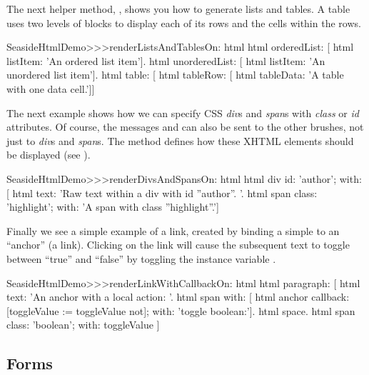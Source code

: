 \documentclass[a4paper,10pt,twoside]{book}
\begin{document}
The next helper method, , shows you how to
generate lists and tables.
A table uses two levels of blocks to display each of its rows and the cells within the
rows.

\begin{code}{}
SeasideHtmlDemo>>>renderListsAndTablesOn: html 
	html orderedList: [
		html listItem: 'An ordered list item'].
	html unorderedList: [
		html listItem: 'An unordered list item'].
	html table: [
		html tableRow: [
			html tableData: 'A table with one data cell.']]
\end{code}

The next example shows how we can specify CSS \emph{div}s and \emph{span}s with
\emph{class} or \emph{id} attributes.
Of course, the messages  and  can also be sent to the other brushes,
not just to \emph{div}s and \emph{span}s.
The method  defines how these XHTML elements should be
displayed (see ).

\begin{code}{}
SeasideHtmlDemo>>>renderDivsAndSpansOn: html 
	html div
		id: 'author';
		with: [
			html text: 'Raw text within a div with id ''author''. '.
			html span
				class: 'highlight';
				with: 'A span with class ''highlight''.']
\end{code}

Finally we see a simple example of a link, created by binding a simple
 to an ``anchor'' (\ie a link).
Clicking on the link will cause the subsequent text to toggle between ``true'' and
``false'' by toggling the instance variable .

\begin{code}{}
SeasideHtmlDemo>>>renderLinkWithCallbackOn: html 
	html paragraph: [
		html text: 'An anchor with a local action: '.
		html span with: [
			html anchor
				callback: [toggleValue := toggleValue not];
				with: 'toggle boolean:'].
		html space.
		html span
			class: 'boolean';
			with: toggleValue ]
\end{code}


\subsection{Forms}
\end{document}
